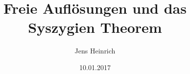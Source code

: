 
\usepackage[left=3cm,right=3cm]{geometry}
\usepackage[T1]{fontenc}
\usepackage{lmodern}
\usepackage{standalone}









\usepackage[ngerman]{babel}
\renewcommand{\id}{\ensuremath{Id}}
\renewcommand{\familydefault}{\rmdefault}

\title{Freie Aufl\"osungen und das Syszygien Theorem}
\author{Jens Heinrich}
\date{10.01.2017}



